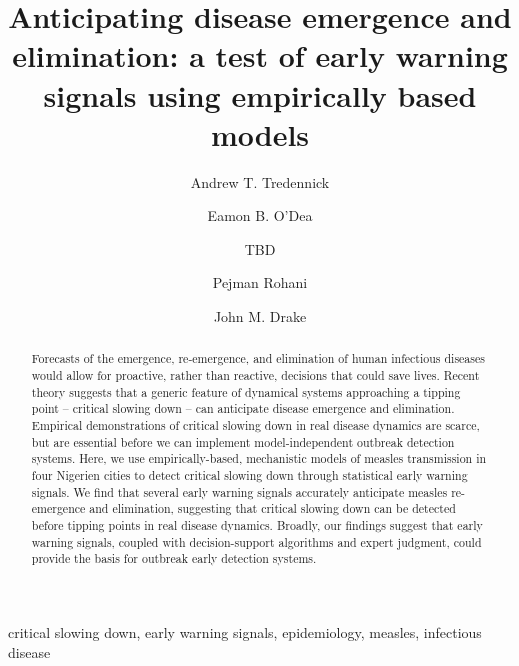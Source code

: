 \documentclass[3p]{elsarticle} %
\begin{document}
\begin{frontmatter}

  \title{Anticipating disease emergence and elimination: a test of early warning
signals using empirically based models}
    \author[UGA,CEID]{Andrew T. Tredennick}
    \author[UGA,CEID]{Eamon B. O'Dea}
  
  
    \author[other]{TBD}
  
  
    \author[UGA,CEID,ID]{Pejman Rohani}
  
  
    \author[UGA,CEID]{John M. Drake}
  
      \address[UGA]{Odum School of Ecology, University of Georgia, Athens, GA 30602, USA}
    \address[CEID]{Center for the Ecology of Infectious Diseases, University of Georgia,
Athens, GA 30602, USA}
    \address[other]{A University of Somewhere}
    \address[ID]{Department of Infectious Diseases, University of Georgia, Athens, GA
30602, USA}
  
  \begin{abstract}
  Forecasts of the emergence, re-emergence, and elimination of human
  infectious diseases would allow for proactive, rather than reactive,
  decisions that could save lives. Recent theory suggests that a generic
  feature of dynamical systems approaching a tipping point -- critical
  slowing down -- can anticipate disease emergence and elimination.
  Empirical demonstrations of critical slowing down in real disease
  dynamics are scarce, but are essential before we can implement
  model-independent outbreak detection systems. Here, we use
  empirically-based, mechanistic models of measles transmission in four
  Nigerien cities to detect critical slowing down through statistical
  early warning signals. We find that several early warning signals
  accurately anticipate measles re-emergence and elimination, suggesting
  that critical slowing down can be detected before tipping points in real
  disease dynamics. Broadly, our findings suggest that early warning
  signals, coupled with decision-support algorithms and expert judgment,
  could provide the basis for outbreak early detection systems.
  \end{abstract}
   \begin{keyword} critical slowing down, early warning signals, epidemiology, measles, infectious disease\end{keyword}
 \end{frontmatter}
\end{document}
